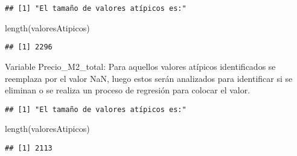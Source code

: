 \documentclass[
]{article}
\newenvironment{Shaded}{\begin{snugshade}}{\end{snugshade}}
\newcommand{\ConstantTok}[1]{\textcolor[rgb]{0.00,0.00,0.00}{#1}}
\newcommand{\FunctionTok}[1]{\textcolor[rgb]{0.00,0.00,0.00}{#1}}
\newcommand{\NormalTok}[1]{#1}
\newcommand{\OtherTok}[1]{\textcolor[rgb]{0.56,0.35,0.01}{#1}}
\newcommand{\SpecialCharTok}[1]{\textcolor[rgb]{0.00,0.00,0.00}{#1}}
\newcommand{\StringTok}[1]{\textcolor[rgb]{0.31,0.60,0.02}{#1}}
\begin{document}
\begin{verbatim}
## [1] "El tamaño de valores atípicos es:"
\end{verbatim}

\begin{Shaded}
\begin{Highlighting}[]
\FunctionTok{length}\NormalTok{(valoresAtipicos)}
\end{Highlighting}
\end{Shaded}

\begin{verbatim}
## [1] 2296
\end{verbatim}

\begin{Shaded}
\end{Shaded}

Variable Precio\_M2\_total: Para aquellos valores atípicos identificados
se reemplaza por el valor NaN, luego estos serán analizados para
identificar si se eliminan o se realiza un proceso de regresión para
colocar el valor.

\begin{Shaded}
\end{Shaded}

\begin{verbatim}
## [1] "El tamaño de valores atípicos es:"
\end{verbatim}

\begin{Shaded}
\begin{Highlighting}[]
\FunctionTok{length}\NormalTok{(valoresAtipicos)}
\end{Highlighting}
\end{Shaded}

\begin{verbatim}
## [1] 2113
\end{verbatim}
\end{document}
